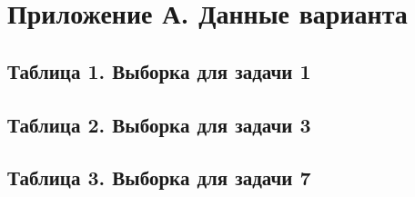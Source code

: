 \documentclass[a4paper,14pt]{extarticle}
\begin{document}
\appendix
\section*{Приложение А. Данные варианта}

\subsection*{Таблица 1. Выборка для задачи 1}


\subsection*{Таблица 2. Выборка для задачи 3}


\subsection*{Таблица 3. Выборка для задачи 7}

\end{document}
